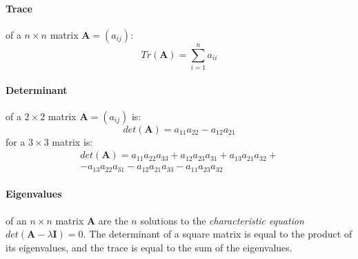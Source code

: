 \documentclass[a4paper,twocolumn]{article}
\begin{document}
\paragraph{Trace} of a $n \times n$ matrix $\mathbf{A} = (a_{ij})$:
\begin{equation}
	Tr(\mathbf{A}) = \sum_{i=1}^n a_{ii}
\end{equation}
\paragraph{Determinant} of a $2 \times 2$ matrix $\mathbf{A} = (a_{ij})$ is:
\begin{equation}
	det(\mathbf{A}) = a_{11} a_{22} - a_{12} a_{21}
\end{equation}
for a $3 \times 3$ matrix is:
\begin{multline*}
	det(\mathbf{A}) = a_{11} a_{22} a_{33} + a_{12} a_{23} a_{31} +
	a_{13} a_{21} a_{32} + \\ - a_{13} a_{22} a_{31} - a_{12} a_{21}
	a_{33} - a_{11} a_{23} a_{32}
\end{multline*}
\paragraph{Eigenvalues} of an $n \times n$ matrix $\mathbf{A}$ are the $n$
solutions to the \textit{characteristic equation} $det(\mathbf{A} - \lambda
\mathbf{I}) = 0$. The determinant of a square matrix is equal to the product
of its eigenvalues, and the trace is equal to the sum of the eigenvalues.
\end{document}
